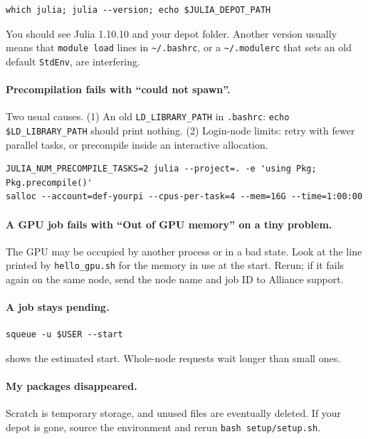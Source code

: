 \begin{lstlisting}
which julia; julia --version; echo $JULIA_DEPOT_PATH
\end{lstlisting}

You should see Julia 1.10.10 and your depot folder. Another version usually means that
\texttt{module load} lines in \texttt{\textasciitilde/.bashrc}, or a \texttt{\textasciitilde/.modulerc}
that sets an old default \texttt{StdEnv}, are interfering.

\paragraph{Precompilation fails with ``could not spawn''.}
Two usual causes. (1) An old \texttt{LD\_LIBRARY\_PATH} in \texttt{.bashrc}: \texttt{echo
\$LD\_LIBRARY\_PATH} should print nothing. (2) Login-node limits: retry with fewer parallel
tasks, or precompile inside an interactive allocation.

\begin{lstlisting}
JULIA_NUM_PRECOMPILE_TASKS=2 julia --project=. -e 'using Pkg; Pkg.precompile()'
salloc --account=def-yourpi --cpus-per-task=4 --mem=16G --time=1:00:00
\end{lstlisting}

\paragraph{A GPU job fails with ``Out of GPU memory'' on a tiny problem.}
The GPU may be occupied by another process or in a bad state. Look at the line printed by
\texttt{hello\_gpu.sh} for the memory in use at the start. Rerun; if it fails again on the same
node, send the node name and job ID to Alliance support.

\paragraph{A job stays pending.}
\begin{lstlisting}
squeue -u $USER --start
\end{lstlisting}
shows the estimated start. Whole-node requests wait longer than small ones.

\paragraph{My packages disappeared.}
Scratch is temporary storage, and unused files are eventually deleted. If your depot is gone,
source the environment and rerun \texttt{bash setup/setup.sh}.
